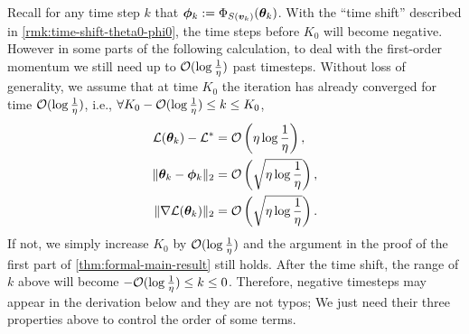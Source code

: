 \begin{remark}
    Recall for any time step $k$ that ${\bm{\phi}}_k := \Phi_{S({\bm{v}}_k)}({\bm{\theta}}_k)$. With the ``time shift'' described in \cref{rmk:time-shift-theta0-phi0}, the time steps before $K_0$ will become negative. However in some parts of the following calculation, to deal with the first-order momentum we still need up to $\mathcal{O}(\log \frac{1}{\eta})$ past timesteps. Without loss of generality, we assume that at time $K_0$ the iteration has already converged for time $\mathcal{O}(\log \frac{1}{\eta})$, i.e., $\forall K_0 - \mathcal{O}(\log \frac{1}{\eta}) \leq k \leq K_0$,
    \begin{align*}
        \mathcal{L}({\bm{\theta}}_k) - \mathcal{L}^* &= \mathcal{O}\left(\eta\log\frac{1}{\eta}\right), \\
        \|{\bm{\theta}}_k -{\bm{\phi}}_k\|_2 &= \mathcal{O}\left(\sqrt{\eta\log\frac{1}{\eta}}\right), \\
        \|\nabla \mathcal{L}({\bm{\theta}}_k)\|_2 &=\mathcal{O}\left(\sqrt{\eta\log\frac{1}{\eta}}\right).
    \end{align*}
    If not, we simply increase $K_0$ by $\mathcal{O}(\log \frac{1}{\eta})$ and the argument in the proof of the first part of \cref{thm:formal-main-result} still holds. After the time shift, the range of $k$ above will become $-\mathcal{O}(\log \frac{1}{\eta}) \leq k \leq 0$.
    Therefore, negative timesteps may appear in the derivation below and they are not typos; We just need their three properties above to control the order of some terms.
\end{remark}







